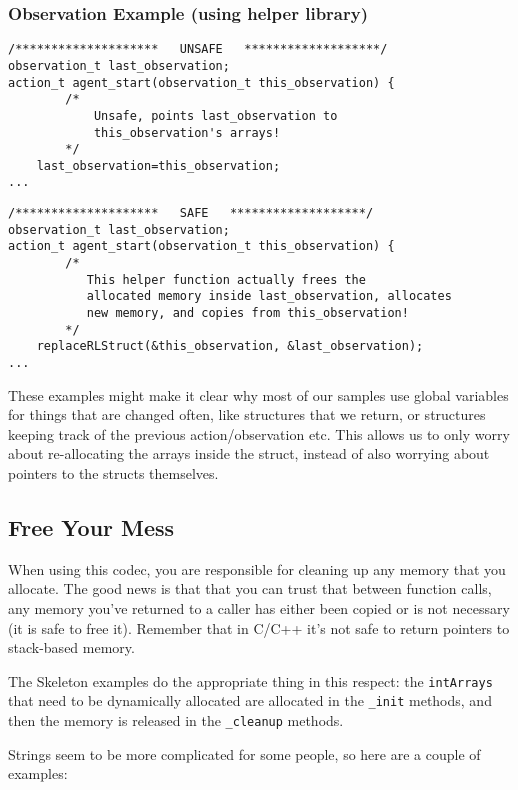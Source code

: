 \documentclass[11pt]{article}
\begin{document}
\subsubsection{Observation Example (using helper library)}


\begin{verbatim}
/********************   UNSAFE   *******************/
observation_t last_observation;
action_t agent_start(observation_t this_observation) {
        /*
            Unsafe, points last_observation to
            this_observation's arrays!
        */
    last_observation=this_observation;
...
\end{verbatim}

\begin{verbatim}
/********************   SAFE   *******************/
observation_t last_observation;
action_t agent_start(observation_t this_observation) {
        /*
           This helper function actually frees the
           allocated memory inside last_observation, allocates 
           new memory, and copies from this_observation!
        */
    replaceRLStruct(&this_observation, &last_observation);
...
\end{verbatim}

These examples might make it clear why most of our samples use global variables for things that are changed often, like structures that we return, or structures keeping track of the previous action/observation etc.  
This allows us to only worry about re-allocating the arrays inside the struct, instead of also worrying about pointers to the structs themselves.

\subsection{Free Your Mess}
When using this codec, you are responsible for cleaning up any memory that you allocate. The good news is that that you can trust that between function calls, any memory you've returned to a caller has either been
copied or is not necessary (it is safe to free it).  Remember that in C/C++ it's not safe to return pointers to stack-based memory.

The Skeleton examples do the appropriate thing in this respect: the \texttt{intArrays} that need to be dynamically allocated are allocated in the \texttt{\_init} methods, and then the memory is released in the \texttt{\_cleanup} methods.

Strings seem to be more complicated for some people, so here are a couple of examples:
\end{document}
